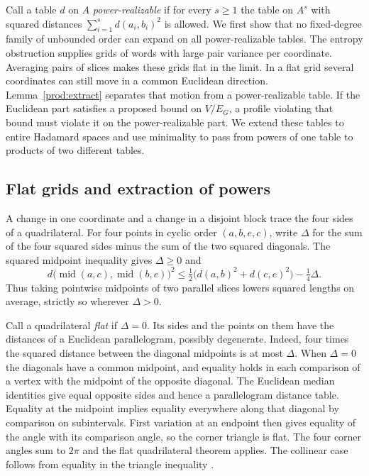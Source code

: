 Call a table $d$ on $A$ \emph{power-realizable} if for every $s\ge1$
the table on $A^s$ with squared distances $\sum_{i=1}^s d(a_i,b_i)^2$
is allowed. We first show that no fixed-degree family of unbounded order can expand
on all power-realizable tables. The entropy obstruction supplies grids of words
with large pair variance per coordinate. Averaging pairs of slices makes
these grids flat in the limit. In a flat grid several coordinates can
still move in a common Euclidean direction. Lemma~\ref{prod:extract}
separates that motion from a power-realizable table. If the Euclidean part satisfies a proposed bound on $V/E_G$, a
profile violating that bound must violate it on the power-realizable
part. We extend these tables to entire Hadamard spaces
and use minimality to pass from powers of one table to products of two
different tables.

\subsection{Flat grids and extraction of powers}

A change in one coordinate and a change in a disjoint block trace the
four sides of a quadrilateral. For four points in cyclic order $(a,b,e,c)$,
write $\Delta$ for the sum of the four squared sides minus the sum of
the two squared diagonals. The squared midpoint inequality gives
$\Delta\ge0$ and
\begin{equation}\label{prod:drop}
 d\bigl(\operatorname{mid}(a,c),\operatorname{mid}(b,e)\bigr)^2
 \le \tfrac12\bigl(d(a,b)^2+d(c,e)^2\bigr)-\tfrac14\Delta .
\end{equation}
Thus taking pointwise midpoints of two parallel slices lowers squared
lengths on average, strictly so wherever $\Delta>0$.

Call a quadrilateral \emph{flat} if $\Delta=0$. Its sides and the points
on them have the distances of a Euclidean parallelogram, possibly
degenerate. Indeed, four times the squared distance between the diagonal
midpoints is at most $\Delta$. When $\Delta=0$ the diagonals have a common
midpoint, and equality holds in each comparison of a vertex with the
midpoint of the opposite diagonal. The Euclidean median identities give
equal opposite sides and hence a parallelogram distance table.
Equality at the midpoint implies equality everywhere along that diagonal
by comparison on subintervals. First variation at an endpoint then
gives equality of the angle with its comparison angle, so the corner
triangle is flat. The four corner angles sum to $2\pi$ and the flat
quadrilateral theorem applies. The collinear case follows from equality
in the triangle inequality
\cite[Chapter II.2, Proposition 2.9, Exercise 2.10 and Theorem 2.11]{BH}.

